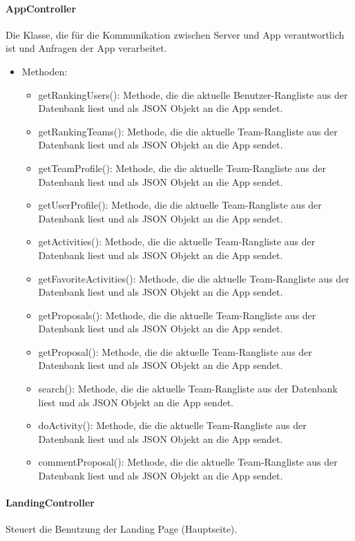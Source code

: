 	\paragraph{AppController}Die Klasse, die f\"ur die Kommunikation zwischen Server und App verantwortlich ist und Anfragen der App verarbeitet.
		\begin{itemize}
			\item Methoden:
			\begin{itemize}
				\item getRankingUsers(): Methode, die die aktuelle Benutzer-Rangliste aus der Datenbank liest und als JSON Objekt an die App sendet.
				\item getRankingTeams(): Methode, die die aktuelle Team-Rangliste aus der Datenbank liest und als JSON Objekt an die App sendet.
				\item getTeamProfile(): Methode, die die aktuelle Team-Rangliste aus der Datenbank liest und als JSON Objekt an die App sendet. %
				\item getUserProfile(): Methode, die die aktuelle Team-Rangliste aus der Datenbank liest und als JSON Objekt an die App sendet. %
				\item getActivities(): Methode, die die aktuelle Team-Rangliste aus der Datenbank liest und als JSON Objekt an die App sendet. %
				\item getFavoriteActivities(): Methode, die die aktuelle Team-Rangliste aus der Datenbank liest und als JSON Objekt an die App sendet. %
				\item getProposals(): Methode, die die aktuelle Team-Rangliste aus der Datenbank liest und als JSON Objekt an die App sendet. %
				\item getProposal(): Methode, die die aktuelle Team-Rangliste aus der Datenbank liest und als JSON Objekt an die App sendet. %
				\item search(): Methode, die die aktuelle Team-Rangliste aus der Datenbank liest und als JSON Objekt an die App sendet. %
				\item doActivity(): Methode, die die aktuelle Team-Rangliste aus der Datenbank liest und als JSON Objekt an die App sendet. %
				\item commentProposal(): Methode, die die aktuelle Team-Rangliste aus der Datenbank liest und als JSON Objekt an die App sendet. %
			\end{itemize}
		\end{itemize}
	\paragraph{LandingController}Steuert die Benutzung der Landing Page (Hauptseite).
